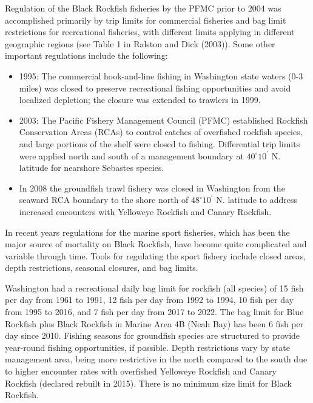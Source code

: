 \documentclass[11pt,
  letterpaper,
]{article}
\providecommand{\tightlist}{%
  \setlength{\itemsep}{0pt}\setlength{\parskip}{0pt}}
\providecommand{\tightlist}{%
  \setlength{\itemsep}{0pt}\setlength{\parskip}{0pt}}
\begin{document}
Regulation of the Black Rockfish fisheries by the PFMC prior to 2004 was accomplished primarily by trip limits for commercial fisheries and bag limit restrictions for recreational fisheries, with different limits applying in different geographic regions (see Table 1 in Ralston and Dick (2003)). Some other important regulations include the following:

\begin{itemize}
\tightlist
\item
  1995: The commercial hook-and-line fishing in Washington state waters (0-3 miles) was closed to preserve recreational fishing opportunities and avoid localized depletion; the closure was extended to trawlers in 1999.\\
\item
  2003: The Pacific Fishery Management Council (PFMC) established Rockfish Conservation Areas (RCAs) to control catches of overfished rockfish species, and large portions of the shelf were closed to fishing. Differential trip limits were applied north and south of a management boundary at \(40^\circ 10^\prime\) N. latitude for nearshore Sebastes species.
\item
  In 2008 the groundfish trawl fishery was closed in Washington from the seaward RCA boundary to the shore north of \(48^\circ 10^\prime\) N. latitude to address increased encounters with Yelloweye Rockfish and Canary Rockfish.
\end{itemize}

In recent years regulations for the marine sport fisheries, which has been the major source of mortality on Black Rockfish, have become quite complicated and variable through time. Tools for regulating the sport fishery include closed areas, depth restrictions, seasonal closures, and bag limits.

Washington had a recreational daily bag limit for rockfish (all species) of 15 fish per day from 1961 to 1991, 12 fish per day from 1992 to 1994, 10 fish per day from 1995 to 2016, and 7 fish per day from 2017 to 2022. The bag limit for Blue Rockfish plus Black Rockfish in Marine Area 4B (Neah Bay) has been 6 fish per day since 2010. Fishing seasons for groundfish species are structured to provide year-round fishing opportunities, if possible. Depth restrictions vary by state management area, being more restrictive in the north compared to the south due to higher encounter rates with overfished Yelloweye Rockfish and Canary Rockfish (declared rebuilt in 2015). There is no minimum size limit for Black Rockfish.
\end{document}
